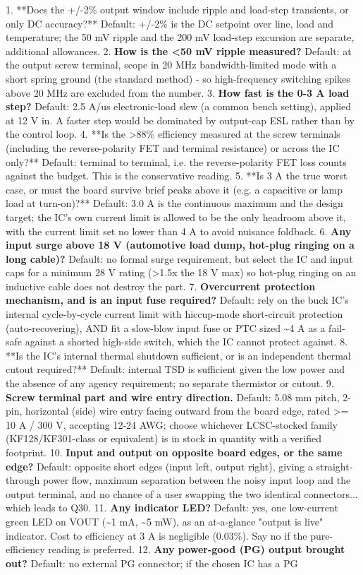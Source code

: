 \documentclass[11pt,a4paper]{article}
\begin{document}
1. {*}{*}Does the +/-2\% output window include ripple and load-step transients, or only DC accuracy?{*}{*} Default: +/-2\% is the DC setpoint over line, load and temperature; the 50 mV ripple and the 200 mV load-step excursion are separate, additional allowances. 2. \textbf{How is the \textless{}50 mV ripple measured?} Default: at the output screw terminal, scope in 20 MHz bandwidth-limited mode with a short spring ground (the standard method) - so high-frequency switching spikes above 20 MHz are excluded from the number. 3. \textbf{How fast is the 0-3 A load step?} Default: 2.5 A/us electronic-load slew (a common bench setting), applied at 12 V in. A faster step would be dominated by output-cap ESL rather than by the control loop. 4. {*}{*}Is the \textgreater{}88\% efficiency measured at the screw terminals (including the reverse-polarity FET and terminal resistance) or across the IC only?{*}{*} Default: terminal to terminal, i.e. the reverse-polarity FET loss counts against the budget. This is the conservative reading. 5. {*}{*}Is 3 A the true worst case, or must the board survive brief peaks above it (e.g. a capacitive or lamp load at turn-on)?{*}{*} Default: 3.0 A is the continuous maximum and the design target; the IC's own current limit is allowed to be the only headroom above it, with the current limit set no lower than 4 A to avoid nuisance foldback. 6. \textbf{Any input surge above 18 V (automotive load dump, hot-plug ringing on a long cable)?} Default: no formal surge requirement, but select the IC and input caps for a minimum 28 V rating (\textgreater{}1.5x the 18 V max) so hot-plug ringing on an inductive cable does not destroy the part. 7. \textbf{Overcurrent protection mechanism, and is an input fuse required?} Default: rely on the buck IC's internal cycle-by-cycle current limit with hiccup-mode short-circuit protection (auto-recovering), AND fit a slow-blow input fuse or PTC sized \textasciitilde{}4 A as a fail-safe against a shorted high-side switch, which the IC cannot protect against. 8. {*}{*}Is the IC's internal thermal shutdown sufficient, or is an independent thermal cutout required?{*}{*} Default: internal TSD is sufficient given the low power and the absence of any agency requirement; no separate thermistor or cutout. 9. \textbf{Screw terminal part and wire entry direction.} Default: 5.08 mm pitch, 2-pin, horizontal (side) wire entry facing outward from the board edge, rated \textgreater{}= 10 A / 300 V, accepting 12-24 AWG; choose whichever LCSC-stocked family (KF128/KF301-class or equivalent) is in stock in quantity with a verified footprint. 10. \textbf{Input and output on opposite board edges, or the same edge?} Default: opposite short edges (input left, output right), giving a straight-through power flow, maximum separation between the noisy input loop and the output terminal, and no chance of a user swapping the two identical connectors... which leads to Q30. 11. \textbf{Any indicator LED?} Default: yes, one low-current green LED on VOUT (\textasciitilde{}1 mA, \textasciitilde{}5 mW), as an at-a-glance "output is live" indicator. Cost to efficiency at 3 A is negligible (0.03\%). Say no if the pure-efficiency reading is preferred. 12. \textbf{Any power-good (PG) output brought out?} Default: no external PG connector; if the chosen IC has a PG 
\end{document}
